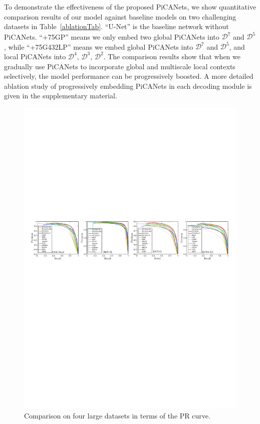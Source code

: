 \documentclass[10pt,twocolumn,letterpaper]{article}
\begin{document}
To demonstrate the effectiveness of the proposed PiCANets, we show quantitative comparison results of our model against baseline models on two challenging datasets in Table~\ref{ablationTab}. ``U-Net'' is the baseline network without PiCANets. ``+75GP'' means we only embed two global PiCANets into $\mathcal D^7$ and $\mathcal D^5$, while ``+75G432LP'' means we embed global PiCANets into $\mathcal D^7$ and $\mathcal D^5$, and local PiCANets into $\mathcal D^4$, $\mathcal D^3$, $\mathcal D^2$. The comparison results show that when we gradually use PiCANets to incorporate global and multiscale local contexts selectively, the model performance can be progressively boosted. A more detailed ablation study of progressively embedding PiCANets in each decoding module is given in the supplementary material.

\begin{figure}[!t]
  \graphicspath{{Figures/PR_curves/}}
  \centering
  \includegraphics[width=1\linewidth]{PR_curves.pdf}
  \caption{Comparison on four large datasets in terms of the PR curve.}
  \label{prcurve}
  \vspace{-0.1cm}
\end{figure}
\end{document}
